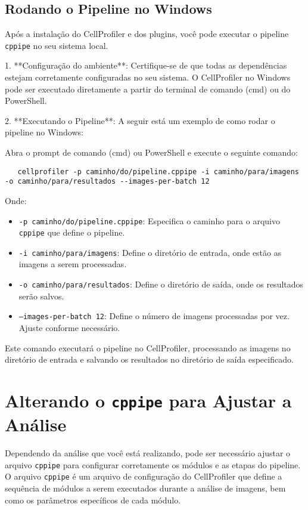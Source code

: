 \documentclass[a4paper, 12pt]{article}
\begin{document}
\subsection{Rodando o Pipeline no Windows}

Após a instalação do CellProfiler e dos plugins, você pode executar o pipeline \texttt{cppipe} no seu sistema local.

1. **Configuração do ambiente**:
   Certifique-se de que todas as dependências estejam corretamente configuradas no seu sistema. O CellProfiler no Windows pode ser executado diretamente a partir do terminal de comando (cmd) ou do PowerShell.

2. **Executando o Pipeline**:
   A seguir está um exemplo de como rodar o pipeline no Windows:

   Abra o prompt de comando (cmd) ou PowerShell e execute o seguinte comando:

   \begin{verbatim}
   cellprofiler -p caminho/do/pipeline.cppipe -i caminho/para/imagens -o caminho/para/resultados --images-per-batch 12
   \end{verbatim}

   Onde:
   \begin{itemize}
     \item \texttt{-p caminho/do/pipeline.cppipe}: Especifica o caminho para o arquivo \texttt{cppipe} que define o pipeline.
     \item \texttt{-i caminho/para/imagens}: Define o diretório de entrada, onde estão as imagens a serem processadas.
     \item \texttt{-o caminho/para/resultados}: Define o diretório de saída, onde os resultados serão salvos.
     \item \texttt{--images-per-batch 12}: Define o número de imagens processadas por vez. Ajuste conforme necessário.
   \end{itemize}

   Este comando executará o pipeline no CellProfiler, processando as imagens no diretório de entrada e salvando os resultados no diretório de saída especificado.

\section{Alterando o \texttt{cppipe} para Ajustar a Análise}

Dependendo da análise que você está realizando, pode ser necessário ajustar o arquivo \texttt{cppipe} para configurar corretamente os módulos e as etapas do pipeline. O arquivo \texttt{cppipe} é um arquivo de configuração do CellProfiler que define a sequência de módulos a serem executados durante a análise de imagens, bem como os parâmetros específicos de cada módulo.
\end{document}
